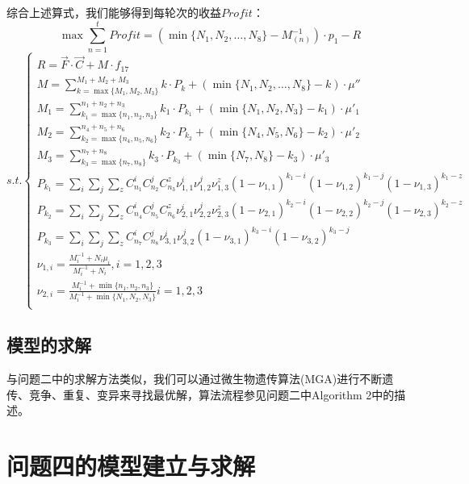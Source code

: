 \documentclass[withoutpreface,bwprint]{cumcmthesis} %
\begin{document}
综合上述算式，我们能够得到每轮次的收益$Profit$：
$$\max	\sum_{n=1}^{t}\textit{Profit}=(\min \{N_{1},N_{2},\dots,N_{8}\}-M_{(n)}^{-1})\cdot p_{1}-R$$
\begin{equation*}
s.t.\begin{cases}
	 R=\vec{F}\cdot \vec{C} + M\cdot f_{17}\\
	 M=\sum_{k=\max \{M_{1},M_{2},M_{3}\}}^{M_{1}+M_{2}+M_{3}}k\cdot P_{k}+(\min \{N_{1},N_{2},\dots,N_{8}\}-k)\cdot \mu''\\
	 M_{1}=\sum_{k_{1}=\max \{n_{1},n_{2},n_{3}\}}^{n_{1}+n_{2}+n_{3}}k_{1}\cdot P_{k_{1}}+(\min \{N_{1},N_{2},N_{3}\}-k_{1})\cdot \mu'_{1}\\
	 M_{2}=\sum_{k_{2}=\max \{n_{4},n_{5},n_{6}\}}^{n_{4}+n_{5}+n_{6}}k_{2}\cdot P_{k_{2}}+(\min \{N_{4},N_{5},N_{6}\}-k_{2})\cdot \mu'_{2}\\
	 M_{3}=\sum_{k_{3}=\max \{n_{7},n_{8}\}}^{n_{7}+n_{8}}k_{3}\cdot P_{k_{3}}+(\min \{N_{7},N_{8}\}-k_{3})\cdot \mu'_{3}\\
	 P_{k_{1}}=\sum_{i}\sum_{j}\sum_{z}C_{n_{1}}^{i}C_{n_{2}}^{j}C_{n_{3}}^{z}\nu_{1,1}^{i}\nu_{1,2}^{j}\nu_{1,3}^{z}(1-\nu_{1,1})^{k_{1}-i}(1-\nu_{1,2})^{k_{1}-j}(1-\nu_{
	 1,3})^{k_{1}-z}\\
	 P_{k_{2}}=\sum_{i}\sum_{j}\sum_{z}C_{n_{4}}^{i}C_{n_{5}}^{j}C_{n_{6}}^{z}\nu_{2,1}^{i}\nu_{2,2}^{j}\nu_{2,3}^{z}(1-\nu_{2,1})^{k_{2}-i}(1-\nu_{2,2})^{k_{2}-j}(1-\nu_{
	 2,3})^{k_{2}-z}\\
	 P_{k_{3}}=\sum_{i}\sum_{j}\sum_{z}C_{n_{7}}^{i}C_{n_{8}}^{j}\nu_{3,1}^{i}\nu_{3,2}^{j}(1-\nu_{3,1})^{k_{3}-i}(1-\nu_{3,2})^{k_{3}-j}\\
	 \nu_{1,i}=\frac{M_{i}^{-1}+N_{i}\mu_{i}}{M_{i}^{-1}+N_{i}} ,i=1,2,3\\
	\nu_{2,i}=\frac{M_{i}^{-1}+\min \{ n_{1},n_{2},n_{3}\}}{M_{i}^{-1}+\min \{N_{1},N_{2},N_{3}\}} i=1,2,3\\
	\end{cases}
\end{equation*}
\subsection{模型的求解}
与问题二中的求解方法类似，我们可以通过微生物遗传算法(MGA)进行不断遗传、竞争、重复、变异来寻找最优解，算法流程参见问题二中Algorithm 2中的描述。



\section{问题四的模型建立与求解}
\end{document}
